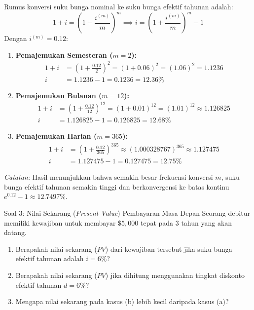 \documentclass[11pt,a4paper]{article}
\begin{document}
\begin{solutionbox}[Soal 2]
Rumus konversi suku bunga nominal ke suku bunga efektif tahunan adalah:
\begin{equation*}
    1 + i = \left( 1 + \frac{i^{(m)}}{m} \right)^m \implies i = \left( 1 + \frac{i^{(m)}}{m} \right)^m - 1
\end{equation*}
Dengan $i^{(m)} = 0.12$:
\begin{enumerate}[label=(\alph*)]
    \item \textbf{Pemajemukan Semesteran ($m = 2$):}
    \begin{align*}
        1 + i &= \left( 1 + \frac{0.12}{2} \right)^2 = (1 + 0.06)^2 = (1.06)^2 = 1.1236 \\
        i &= 1.1236 - 1 = 0.1236 = \mathbf{12.36\%}
    \end{align*}

    \item \textbf{Pemajemukan Bulanan ($m = 12$):}
    \begin{align*}
        1 + i &= \left( 1 + \frac{0.12}{12} \right)^{12} = (1 + 0.01)^{12} = (1.01)^{12} \approx 1.126825 \\
        i &= 1.126825 - 1 = 0.126825 = \mathbf{12.68\%}
    \end{align*}

    \item \textbf{Pemajemukan Harian ($m = 365$):}
    \begin{align*}
        1 + i &= \left( 1 + \frac{0.12}{365} \right)^{365} \approx (1.000328767)^{365} \approx 1.127475 \\
        i &= 1.127475 - 1 = 0.127475 = \mathbf{12.75\%}
    \end{align*}
\end{enumerate}
\textit{Catatan:} Hasil menunjukkan bahwa semakin besar frekuensi konversi $m$, suku bunga efektif tahunan semakin tinggi dan berkonvergensi ke batas kontinu $e^{0.12} - 1 \approx 12.7497\%$.
\end{solutionbox}

\vspace{1.2em}

\begin{problembox}{Soal 3: Nilai Sekarang (\textit{Present Value}) Pembayaran Masa Depan}
Seorang debitur memiliki kewajiban untuk membayar $\$5{,}000$ tepat pada $3$ tahun yang akan datang.
\begin{enumerate}[label=(\alph*)]
    \item Berapakah nilai sekarang ($PV$) dari kewajiban tersebut jika suku bunga efektif tahunan adalah $i = 6\%$?
    \item Berapakah nilai sekarang ($PV$) jika dihitung menggunakan tingkat diskonto efektif tahunan $d = 6\%$?
    \item Mengapa nilai sekarang pada kasus (b) lebih kecil daripada kasus (a)?
\end{enumerate}
\end{problembox}
\end{document}
